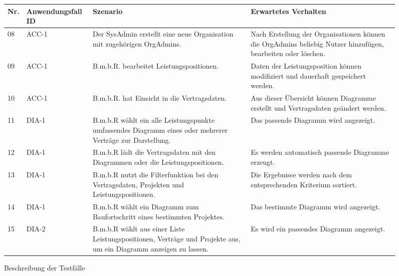 \begin{figure}[!h]
	\begin{center}
		\begin{tabularx}{\textwidth}{ p{} | p{} | p{} | X }
			\textbf{Nr.} & \textbf{Anwendungsfall ID} & \textbf{Szenario} & \textbf{Erwartetes Verhalten} \\ \hline
			
			
			08 & ACC-1 & Der SysAdmin erstellt eine neue Organisation mit zugehörigen OrgAdmins. & Nach Erstellung der Organisationen können die OrgAdmins beliebig Nutzer hinzufügen, bearbeiten oder löschen. \\ \hline
			09 & ACC-1 & B.m.b.R. bearbeitet Leistungspositionen. & Daten der Leistungsposition können modifiziert und dauerhaft gespeichert werden. \\ \hline
			10 & ACC-1 & B.m.b.R. hat Einsicht in die Vertragsdaten. & Aus dieser Übersicht können Diagramme erstellt und Vertragsdaten geändert werden. \\ \hline
			11 & DIA-1 & B.m.b.R wählt ein alle Leistungspunkte umfassendes Diagramm eines oder mehrerer Verträge zur Darstellung. & Das passende Diagramm wird angezeigt. \\ \hline 
			12 & DIA-1 & B.m.b.R lädt die Vertragsdaten mit den Diagrammen oder die Leistungspositionen. & Es werden automatisch passende Diagramme erzeugt. \\ \hline
			13 & DIA-1 & B.m.b.R nutzt die Filterfunktion bei den Vertragsdaten, Projekten und Leistungspositionen. & Die Ergebnisse werden nach dem entsprechenden Kriterium sortiert. \\ \hline
			14 & DIA-1 & B.m.b.R wählt ein Diagramm zum Baufortschritt eines bestimmten Projektes. & Das bestimmte Diagramm wird angezeigt.\\ \hline
			15 & DIA-2 & B.m.b.R wählt aus einer Liste Leistungspositionen, Verträge und Projekte aus, um ein Diagramm anzeigen zu lassen.  & Es wird ein passendes Diagramm angezeigt. \\ \hline 

		\end{tabularx}	
	\end{center}
	\caption{Beschreibung der Testfälle}
	\label{fig:testfaelle-mobile-app-tabelle}
\end{figure}